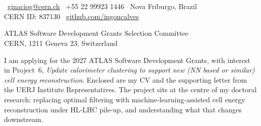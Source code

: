 \documentclass[11pt,a4paper]{article}
\begin{document}

\noindent%
\begin{minipage}[t]{\dimexpr\linewidth-3cm\relax}%
\\[0.4em]
\\[0.8em]
{\color{LightGrey}\small
\faEnvelope\ \href{mailto:ginaciog@cern.ch}{ginaciog@cern.ch}\contactBullet%
\faPhone\ +55 22 99923 1446\contactBullet%
\faMapMarker\ Nova Friburgo, Brazil\\[0.3em]
CERN ID: 837130\contactBullet%
\faGithub\ \href{https://github.com/ingoncalves}{github.com/ingoncalves}
}%
\end{minipage}%
\hfill%
\begin{minipage}[t]{2.7cm}%
%
\end{minipage}%
\par

\vspace{0.75em}
\dividerLine
\vspace{1em}



\vspace{0.5em}


{\color{SlateGrey}
ATLAS Software Development Grants Selection Committee\\
CERN, 1211 Geneva 23, Switzerland
}

\vspace{1em}



\vspace{0.5em}




I am applying for the 2027 ATLAS Software Development Grants, with interest in Project~6, \emph{Update calorimeter clustering to support new (NN based or similar) cell energy reconstruction}. Enclosed are my CV and the supporting letter from the UERJ Institute Representatives. The project sits at the centre of my doctoral research: replacing optimal filtering with machine-learning-assisted cell energy reconstruction under HL-LHC pile-up, and understanding what that changes downstream.
\end{document}
